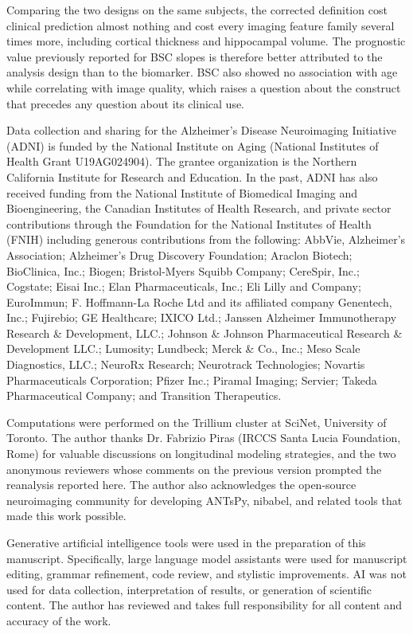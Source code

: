 \documentclass[blue]{ludusofficial}  %
\begin{document}
Comparing the two designs on the same subjects, the corrected definition cost clinical prediction almost nothing and cost every imaging feature family several times more, including cortical thickness and hippocampal volume. The prognostic value previously reported for BSC slopes is therefore better attributed to the analysis design than to the biomarker. BSC also showed no association with age while correlating with image quality, which raises a question about the construct that precedes any question about its clinical use.

\begin{acknowledgments}
Data collection and sharing for the Alzheimer's Disease Neuroimaging Initiative (ADNI) is funded by the National Institute on Aging (National Institutes of Health Grant U19AG024904). The grantee organization is the Northern California Institute for Research and Education. In the past, ADNI has also received funding from the National Institute of Biomedical Imaging and Bioengineering, the Canadian Institutes of Health Research, and private sector contributions through the Foundation for the National Institutes of Health (FNIH) including generous contributions from the following: AbbVie, Alzheimer's Association; Alzheimer's Drug Discovery Foundation; Araclon Biotech; BioClinica, Inc.; Biogen; Bristol-Myers Squibb Company; CereSpir, Inc.; Cogstate; Eisai Inc.; Elan Pharmaceuticals, Inc.; Eli Lilly and Company; EuroImmun; F. Hoffmann-La Roche Ltd and its affiliated company Genentech, Inc.; Fujirebio; GE Healthcare; IXICO Ltd.; Janssen Alzheimer Immunotherapy Research \& Development, LLC.; Johnson \& Johnson Pharmaceutical Research \& Development LLC.; Lumosity; Lundbeck; Merck \& Co., Inc.; Meso Scale Diagnostics, LLC.; NeuroRx Research; Neurotrack Technologies; Novartis Pharmaceuticals Corporation; Pfizer Inc.; Piramal Imaging; Servier; Takeda Pharmaceutical Company; and Transition Therapeutics.

Computations were performed on the Trillium cluster at SciNet, University of Toronto. The author thanks Dr. Fabrizio Piras (IRCCS Santa Lucia Foundation, Rome) for valuable discussions on longitudinal modeling strategies, and the two anonymous reviewers whose comments on the previous version prompted the reanalysis reported here. The author also acknowledges the open-source neuroimaging community for developing ANTsPy, nibabel, and related tools that made this work possible.

Generative artificial intelligence tools were used in the preparation of this manuscript. Specifically, large language model assistants were used for manuscript editing, grammar refinement, code review, and stylistic improvements. AI was not used for data collection, interpretation of results, or generation of scientific content. The author has reviewed and takes full responsibility for all content and accuracy of the work.
\end{acknowledgments}



\end{document}
